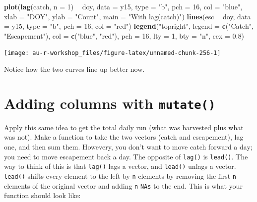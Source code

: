 \documentclass[]{book}
\newenvironment{Shaded}{\begin{snugshade}}{\end{snugshade}}
\newcommand{\KeywordTok}[1]{\textcolor[rgb]{0.13,0.29,0.53}{\textbf{#1}}}
\newcommand{\DataTypeTok}[1]{\textcolor[rgb]{0.13,0.29,0.53}{#1}}
\newcommand{\DecValTok}[1]{\textcolor[rgb]{0.00,0.00,0.81}{#1}}
\newcommand{\FloatTok}[1]{\textcolor[rgb]{0.00,0.00,0.81}{#1}}
\newcommand{\StringTok}[1]{\textcolor[rgb]{0.31,0.60,0.02}{#1}}
\newcommand{\OperatorTok}[1]{\textcolor[rgb]{0.81,0.36,0.00}{\textbf{#1}}}
\newcommand{\NormalTok}[1]{#1}
\theoremstyle{definition}
\theoremstyle{definition}
\theoremstyle{definition}
\theoremstyle{remark}
\begin{document}
\begin{Shaded}
\begin{Highlighting}[]
\KeywordTok{plot}\NormalTok{(}\KeywordTok{lag}\NormalTok{(catch, }\DataTypeTok{n =} \DecValTok{1}\NormalTok{) }\OperatorTok{~}\StringTok{ }\NormalTok{doy, }\DataTypeTok{data =}\NormalTok{ y15, }\DataTypeTok{type =} \StringTok{"b"}\NormalTok{, }\DataTypeTok{pch =} \DecValTok{16}\NormalTok{, }\DataTypeTok{col =} \StringTok{"blue"}\NormalTok{,}
     \DataTypeTok{xlab =} \StringTok{"DOY"}\NormalTok{, }\DataTypeTok{ylab =} \StringTok{"Count"}\NormalTok{, }\DataTypeTok{main =} \StringTok{"With lag(catch)"}\NormalTok{)}
\KeywordTok{lines}\NormalTok{(esc }\OperatorTok{~}\StringTok{ }\NormalTok{doy, }\DataTypeTok{data =}\NormalTok{ y15, }\DataTypeTok{type =} \StringTok{"b"}\NormalTok{, }\DataTypeTok{pch =} \DecValTok{16}\NormalTok{, }\DataTypeTok{col =} \StringTok{"red"}\NormalTok{)}
\KeywordTok{legend}\NormalTok{(}\StringTok{"topright"}\NormalTok{, }\DataTypeTok{legend =} \KeywordTok{c}\NormalTok{(}\StringTok{"Catch"}\NormalTok{, }\StringTok{"Escapement"}\NormalTok{),}
       \DataTypeTok{col =} \KeywordTok{c}\NormalTok{(}\StringTok{"blue"}\NormalTok{, }\StringTok{"red"}\NormalTok{), }\DataTypeTok{pch =} \DecValTok{16}\NormalTok{, }\DataTypeTok{lty =} \DecValTok{1}\NormalTok{, }\DataTypeTok{bty =} \StringTok{"n"}\NormalTok{, }\DataTypeTok{cex =} \FloatTok{0.8}\NormalTok{)}
\end{Highlighting}
\end{Shaded}

\begin{center}\texttt{[image: au-r-workshop\_files/figure-latex/unnamed-chunk-256-1]} \end{center}

Notice how the two curves line up better now.

\section{\texorpdfstring{Adding columns with
\texttt{mutate()}}{Adding columns with mutate()}}\label{adding-columns-with-mutate}

Apply this same idea to get the total daily run (what was harvested plus
what was not). Make a function to take the two vectors (catch and
escapement), lag one, and then sum them. Howevery, you don't want to
move catch forward a day; you need to move escapement back a day. The
opposite of \texttt{lag()} is \texttt{lead()}. The way to think of this
is that \texttt{lag()} lags a vector, and \texttt{lead()} unlags a
vector. \texttt{lead()} shifts every element to the left by \texttt{n}
elements by removing the first \texttt{n} elements of the original
vector and adding \texttt{n} \texttt{NAs} to the end. This is what your
function should look like:
\end{document}

